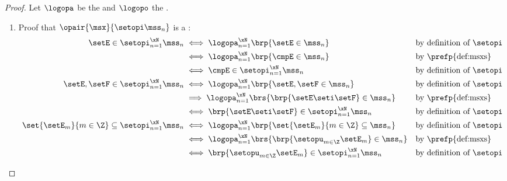 \begin{proof}
Let $\logopa$ be the  and $\logopo$ the .
\begin{enumerate}
  \item Proof that $\opair{\msx}{\setopi \mss_n}$ is a :
    \begin{align*}
      \setE\in\setopi_{n=1}^\xN\mss_n
        &\iff \logopa_{n=1}^\xN\brp{\setE\in\mss_n}                         && \text{by definition of $\setopi$}
      \\&\iff \logopa_{n=1}^\xN\brp{\cmpE\in\mss_n}                         && \text{by \prefp{def:msxs}}
      \\&\iff \cmpE\in\setopi_{n=1}^\xN\mss_n                               && \text{by definition of $\setopi$}
      \\
      \setE,\setF\in\setopi_{n=1}^\xN\mss_n
        &\iff \logopa_{n=1}^\xN\brp{\setE,\setF\in\mss_n}                   && \text{by definition of $\setopi$}
      \\&\implies \logopa_{n=1}^\xN\brs{\brp{\setE\seti\setF}\in\mss_n}         && \text{by \prefp{def:msxs}}
      \\&\iff \brp{\setE\seti\setF}\in\setopi_{n=1}^\xN\mss_n               && \text{by definition of $\setopi$}
      \\
      \set{\setE_m}{m\in\Z}\subseteq\setopi_{n=1}^\xN\mss_n
        &\iff \logopa_{n=1}^\xN\brp{\set{\setE_m}{m\in\Z}\subseteq\mss_n}                       && \text{by definition of $\setopi$}
      \\&\iff \logopa_{n=1}^\xN\brs{\brp{\setopu_{m\in\Z}\setE_m}\in\mss_n} && \text{by \prefp{def:msxs}}
      \\&\iff \brp{\setopu_{m\in\Z}\setE_m}\in\setopi_{n=1}^\xN\mss_n       && \text{by definition of $\setopi$}
    \end{align*}


\end{enumerate}
\end{proof}
